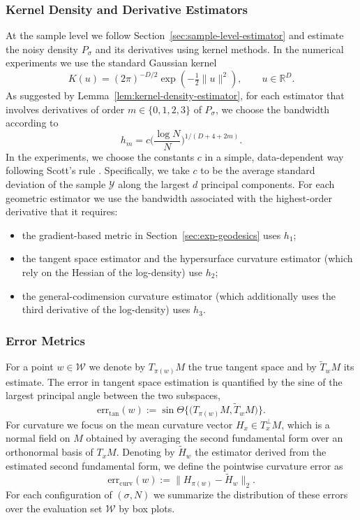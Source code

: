 \documentclass[11pt]{article}
\theoremstyle{plain}
\theoremstyle{definition}
\begin{document}
\subsubsection{Kernel Density and Derivative Estimators}
At the sample level we follow Section~\ref{sec:sample-level-estimator} and estimate the noisy density $P_\sigma$ and its derivatives using kernel methods. In the numerical experiments we use the standard Gaussian kernel
\[
  K(u) = (2\pi)^{-D/2} \exp(-\tfrac{1}{2}\|u\|^2),
  \qquad u \in \mathbb{R}^D.
\]
As suggested by Lemma~\ref{lem:kernel-density-estimator}, for each estimator that involves derivatives of order $m \in \{0,1,2,3\}$ of $P_\sigma$, we choose the bandwidth according to
\[
  h_m
  = c \big(\frac{\log N}{N}\big)^{1/(D + 4 + 2m)}.
\]
In the experiments, we choose the constants $c$ in a simple, data-dependent way following Scott’s rule \citep{Scott1992MultivariateDE}. Specifically, we take $c$ to be the average standard deviation of the sample $\mathcal{Y}$ along the largest $d$ principal components. For each geometric estimator we use the bandwidth associated with the highest-order derivative that it requires:
\begin{itemize}
  \item the gradient-based metric in Section~\ref{sec:exp-geodesics} uses $h_1$;
  \item the tangent space estimator and the hypersurface curvature estimator (which rely on the Hessian of the log-density) use $h_2$;
  \item the general-codimension curvature estimator (which additionally uses the third derivative of the log-density) uses $h_3$.
\end{itemize}


\subsubsection{Error Metrics}
For a point $w \in \mathcal W$ we denote by $T_{\pi(w)} M$ the true tangent space and by $\widetilde{T}_{w} M$ its estimate. The error in tangent space estimation is quantified by the sine of the largest principal angle between the two subspaces,
\[
  \mathrm{err}_{\mathrm{tan}}(w)
  := \sin \Theta\{\big(T_{\pi(w)} M, \widetilde{T}_{w} M\big)\}.
\]
For curvature we focus on the mean curvature vector $H_x \in T_x^\perp M$, which is a normal field on $M$ obtained by averaging the second fundamental form over an orthonormal basis of $T_x M$. Denoting by $\widetilde{H}_w$ the estimator derived from the estimated second fundamental form, we define the pointwise curvature error as
\[
  \mathrm{err}_{\mathrm{curv}}(w)
  := \|H_{\pi(w)} - \widetilde{H}_w\|_2.
\]
For each configuration of $(\sigma,N)$ we summarize the distribution of these errors over the evaluation set $\mathcal W$ by box plots.
\end{document}
